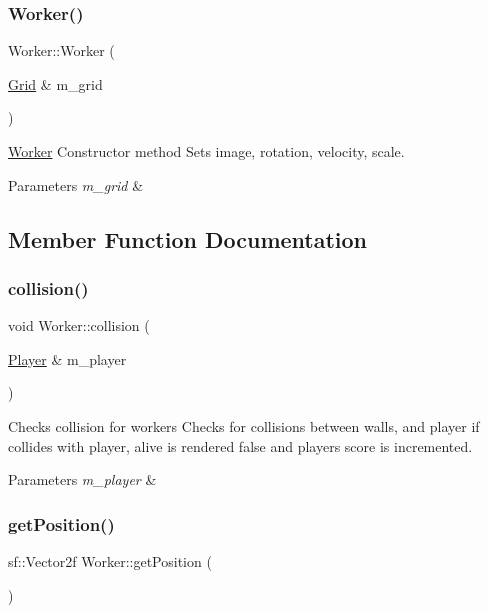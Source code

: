 \subsubsection{\texorpdfstring{Worker()}{Worker()}}
{\footnotesize\ttfamily Worker\+::\+Worker (\begin{DoxyParamCaption}\item[{\mbox{\hyperlink{class_grid}{Grid}} \&}]{m\+\_\+grid }\end{DoxyParamCaption})}



\mbox{\hyperlink{class_worker}{Worker}} Constructor method Sets image, rotation, velocity, scale. 


\begin{DoxyParams}{Parameters}
{\em m\+\_\+grid} & \\
\hline
\end{DoxyParams}


\subsection{Member Function Documentation}
\mbox{\label{class_worker_a6b05fdee2acc4a485e68814f98cd1075}} 
\subsubsection{\texorpdfstring{collision()}{collision()}}
{\footnotesize\ttfamily void Worker\+::collision (\begin{DoxyParamCaption}\item[{\mbox{\hyperlink{class_player}{Player}} \&}]{m\+\_\+player }\end{DoxyParamCaption})}



Checks collision for workers Checks for collisions between walls, and player if collides with player, alive is rendered false and players score is incremented. 


\begin{DoxyParams}{Parameters}
{\em m\+\_\+player} & \\
\hline
\end{DoxyParams}
\mbox{\label{class_worker_a47aa8d5eb21900530255e6a66b7801d9}} 
\subsubsection{\texorpdfstring{getPosition()}{getPosition()}}
{\footnotesize\ttfamily sf\+::\+Vector2f Worker\+::get\+Position (\begin{DoxyParamCaption}{ }\end{DoxyParamCaption})}



